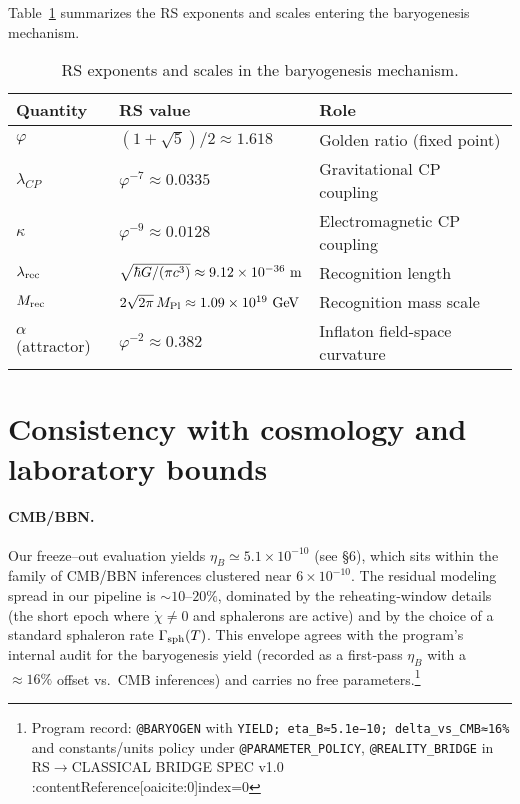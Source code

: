 \documentclass[11pt]{article}
\begin{document}
\medskip\noindent
Table~\ref{tab:rs-exponents} summarizes the RS exponents and scales entering the baryogenesis mechanism.

\begin{table}[ht]
\centering
\caption{RS exponents and scales in the baryogenesis mechanism.}
\label{tab:rs-exponents}
\begin{tabular}{lll}
\toprule
Quantity & RS value & Role \\
\midrule
$\varphi$ & $(1+\sqrt{5})/2\approx 1.618$ & Golden ratio (fixed point) \\
$\lambda_{CP}$ & $\varphi^{-7}\approx 0.0335$ & Gravitational CP coupling \\
$\kappa$ & $\varphi^{-9}\approx 0.0128$ & Electromagnetic CP coupling \\
$\lambda_{\rm rec}$ & $\sqrt{\hbar G/(\pi c^3)}\approx 9.12\times 10^{-36}~{\rm m}$ & Recognition length \\
$M_{\rm rec}$ & $2\sqrt{2\pi}\,M_{\rm Pl}\approx 1.09\times 10^{19}~{\rm GeV}$ & Recognition mass scale \\
$\alpha$ (attractor) & $\varphi^{-2}\approx 0.382$ & Inflaton field-space curvature \\
\bottomrule
\end{tabular}
\end{table}

\section{Consistency with cosmology and laboratory bounds}

\paragraph{CMB/BBN.}
Our freeze–out evaluation yields \(\eta_B \simeq 5.1\times 10^{-10}\) (see §6), which sits within the family of CMB/BBN inferences clustered near \(6\times 10^{-10}\). The residual modeling spread in our pipeline is \(\sim 10\text{–}20\%\), dominated by the reheating‐window details (the short epoch where \(\dot\chi\neq 0\) and sphalerons are active) and by the choice of a standard sphaleron rate \(\Gamma_{\rm sph}(T)\). This envelope agrees with the program’s internal audit for the baryogenesis yield (recorded as a first‑pass \(\eta_B\) with a \(\approx 16\%\) offset vs.\ CMB inferences) and carries no free parameters.\footnote{Program record: \texttt{@BARYOGEN} with \texttt{YIELD; eta\_B≈5.1e−10; delta\_vs\_CMB≈16\%} and constants/units policy under \texttt{@PARAMETER\_POLICY}, \texttt{@REALITY\_BRIDGE} in RS\(\to\)CLASSICAL BRIDGE SPEC v1.0 :contentReference[oaicite:0]{index=0}}
\end{document}
